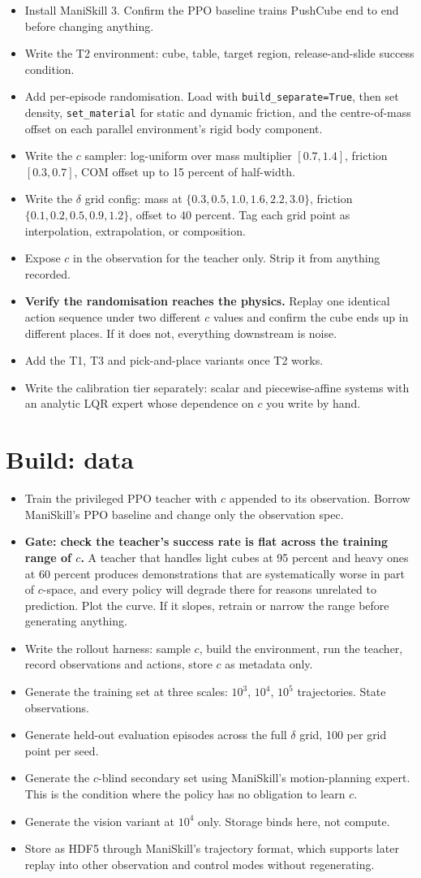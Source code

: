 \documentclass[9pt]{extarticle}
\newcommand{\ck}{\item[$\square$]}
\begin{document}
\begin{itemize}
\ck Install ManiSkill 3. Confirm the PPO baseline trains PushCube end to end before changing anything.
\ck Write the T2 environment: cube, table, target region, release-and-slide success condition.
\ck Add per-episode randomisation. Load with \texttt{build\_separate=True}, then set density, \texttt{set\_material} for static and dynamic friction, and the centre-of-mass offset on each parallel environment's rigid body component.
\ck Write the $c$ sampler: log-uniform over mass multiplier $[0.7, 1.4]$, friction $[0.3, 0.7]$, COM offset up to 15 percent of half-width.
\ck Write the $\delta$ grid config: mass at $\{0.3, 0.5, 1.0, 1.6, 2.2, 3.0\}$, friction $\{0.1, 0.2, 0.5, 0.9, 1.2\}$, offset to 40 percent. Tag each grid point as interpolation, extrapolation, or composition.
\ck Expose $c$ in the observation for the teacher only. Strip it from anything recorded.
\ck \textbf{Verify the randomisation reaches the physics.} Replay one identical action sequence under two different $c$ values and confirm the cube ends up in different places. If it does not, everything downstream is noise.
\ck Add the T1, T3 and pick-and-place variants once T2 works.
\ck Write the calibration tier separately: scalar and piecewise-affine systems with an analytic LQR expert whose dependence on $c$ you write by hand.
\end{itemize}

\section{Build: data}

\begin{itemize}
\ck Train the privileged PPO teacher with $c$ appended to its observation. Borrow ManiSkill's PPO baseline and change only the observation spec.
\ck \textbf{Gate: check the teacher's success rate is flat across the training range of $c$.} A teacher that handles light cubes at 95 percent and heavy ones at 60 percent produces demonstrations that are systematically worse in part of $c$-space, and every policy will degrade there for reasons unrelated to prediction. Plot the curve. If it slopes, retrain or narrow the range before generating anything.
\ck Write the rollout harness: sample $c$, build the environment, run the teacher, record observations and actions, store $c$ as metadata only.
\ck Generate the training set at three scales: $10^3$, $10^4$, $10^5$ trajectories. State observations.
\ck Generate held-out evaluation episodes across the full $\delta$ grid, 100 per grid point per seed.
\ck Generate the $c$-blind secondary set using ManiSkill's motion-planning expert. This is the condition where the policy has no obligation to learn $c$.
\ck Generate the vision variant at $10^4$ only. Storage binds here, not compute.
\ck Store as HDF5 through ManiSkill's trajectory format, which supports later replay into other observation and control modes without regenerating.
\end{itemize}
\end{document}
